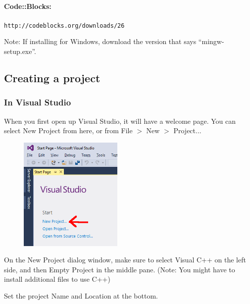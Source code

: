             \paragraph{Code::Blocks:}
                \texttt{http://codeblocks.org/downloads/26}

                Note: If installing for Windows, download the version that
                says ``mingw-setup.exe''.

        \newpage

        \subsection{Creating a project}

            \subsubsection{In Visual Studio}

                When you first open up Visual Studio, it will have a welcome page.
                You can select New Project from here, or from File $>$ New $>$ Project...

                \begin{figure}[h]
                    \centering
                    \includegraphics[width=5cm]{images-2018-01/vs-newproject.png}
                \end{figure}

                On the New Project dialog window, make sure to select Visual C++ on the left side,
                and then Empty Project in the middle pane.
                (Note: You might have to install additional files to use C++)

                Set the project Name and Location at the bottom.
                
